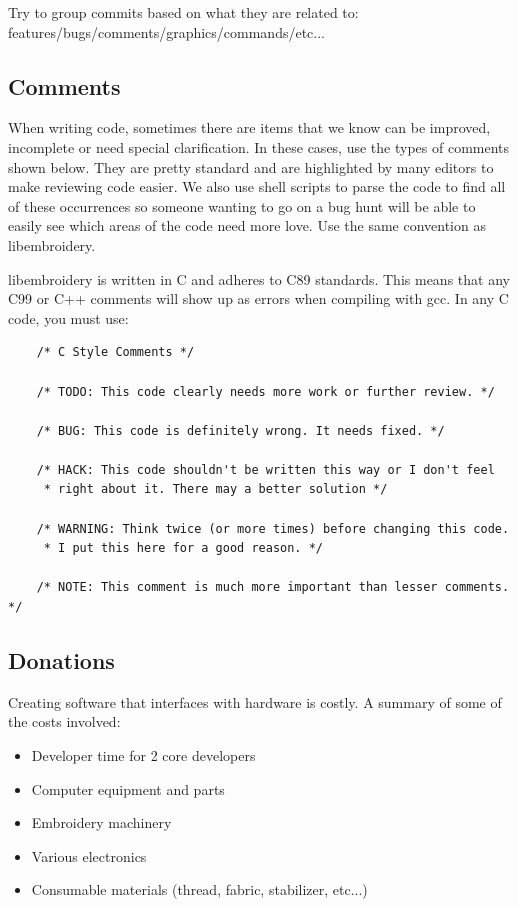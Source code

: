 \documentclass[a4paper, 11pt]{report}
\begin{document}
Try to group commits based on what they are related to: features/bugs/comments/graphics/commands/etc...

\subsection{Comments}

When writing code, sometimes there are items that we know can be improved,
incomplete or need special clarification. In these cases, use the types of
comments shown below. They are pretty standard and are highlighted by many editors to
make reviewing code easier. We also use shell scripts to parse the code to find
all of these occurrences so someone wanting to go on a bug hunt will be able to
easily see which areas of the code need more love. Use the same convention
as libembroidery.

libembroidery is written in C and adheres to C89 standards. This means
that any C99 or C++ comments will show up as errors when compiling with
gcc. In any C code, you must use:

\begin{verbatim}
    /* C Style Comments */

    /* TODO: This code clearly needs more work or further review. */

    /* BUG: This code is definitely wrong. It needs fixed. */

    /* HACK: This code shouldn't be written this way or I don't feel
     * right about it. There may a better solution */

    /* WARNING: Think twice (or more times) before changing this code.
     * I put this here for a good reason. */

    /* NOTE: This comment is much more important than lesser comments. */
\end{verbatim}

\subsection{Donations}

Creating software that interfaces with hardware is costly. A summary of some of the costs involved:
     
\begin{itemize}               
\item Developer time for 2 core developers
\item Computer equipment and parts
\item Embroidery machinery
\item Various electronics
\item Consumable materials (thread, fabric, stabilizer, etc...)
\end{itemize}
\end{document}
